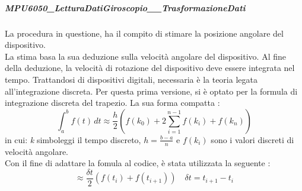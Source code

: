 \documentclass[11pt]{report}
\begin{document}
\subparagraph{MPU6050\_LetturaDatiGiroscopio\_\_TrasformazioneDati}
La procedura in questione, ha il compito di stimare la posizione angolare del dispositivo.\\
La stima basa la sua deduzione sulla velocità angolare del dispositivo. 
Al fine della deduzione, la velocità di rotazione del dispositivo deve essere integrata nel tempo.
Trattandosi di dispositivi digitali, necessaria è la teoria legata all'integrazione discreta.
Per questa prima versione, si è optato per la formula di integrazione discreta del trapezio. La sua forma compatta :
\begin{equation}
    \int_{a}^{b} f(t)\, dt \approx \frac{h}{2} \left( f(k_0) + 2 \sum_{i=1}^{n-1} f(k_i) + f(k_n) \right)
\end{equation}
in cui: \textit{k} simboleggi il tempo discreto, $h=\frac{b-a}{n}$ e $f(k_i)$ sono i valori discreti di velocità angolare.\\
Con il fine di adattare la fomula al codice, è stata utilizzata la seguente :
\begin{equation}
    \approx \frac{\delta t}{2} \left(f(t_i)+f(t_{i+1})\right)  \quad \delta t = t_{i+1} - t_i
\end{equation} 
\end{document}
